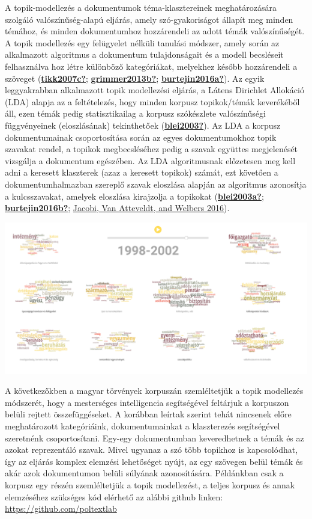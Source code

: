 \documentclass[
]{book}
\begin{document}
A topik-modellezés a dokumentumok téma-klasztereinek meghatározására
szolgáló valószínűség-alapú eljárás, amely szó-gyakoriságot állapít meg
minden témához, és minden dokumentumhoz hozzárendeli az adott témák
valószínűségét. A topik modellezés egy felügyelet nélküli tanulási
módszer, amely során az alkalmazott algoritmus a dokumentum
tulajdonságait és a modell becsléseit felhasználva hoz létre különböző
kategóriákat, melyekhez később hozzárendeli a szöveget
(\protect\hyperlink{ref-tikk2007c}{\textbf{tikk2007c?}};
\protect\hyperlink{ref-grimmer2013b}{\textbf{grimmer2013b?}};
\protect\hyperlink{ref-burtejin2016a}{\textbf{burtejin2016a?}}). Az
egyik leggyakrabban alkalmazott topik modellezési eljárás, a Látens
Dirichlet Allokáció (LDA) alapja az a feltételezés, hogy minden korpusz
topikok/témák keverékéből áll, ezen témák pedig statisztikailag a
korpusz szókészlete valószínűségi függvényeinek (eloszlásának)
tekinthetőek (\protect\hyperlink{ref-blei2003}{\textbf{blei2003?}}). Az
LDA a korpusz dokumentumainak csoportosítása során az egyes
dokumentumokhoz topik szavakat rendel, a topikok megbecsléséhez pedig a
szavak együttes megjelenését vizsgálja a dokumentum egészében. Az LDA
algoritmusnak előzetesen meg kell adni a keresett klaszterek (azaz a
keresett topikok) számát, ezt követően a dokumentumhalmazban szereplő
szavak eloszlása alapján az algoritmus azonosítja a kulcsszavakat,
amelyek eloszlása kirajzolja a topikokat
(\protect\hyperlink{ref-blei2003a}{\textbf{blei2003a?}};
\protect\hyperlink{ref-burtejin2016b}{\textbf{burtejin2016b?}};
\protect\hyperlink{ref-jacobi2016}{Jacobi, Van Atteveldt, and Welbers
2016}).

\begin{center}\includegraphics[width=0.9\linewidth]{figures/08-01_topik_modell} \end{center}

A következőkben a magyar törvények korpuszán szemléltetjük a topik
modellezés módszerét, hogy a mesterséges intelligencia segítségével
feltárjuk a korpuszon belüli rejtett összefüggéseket. A korábban leírtak
szerint tehát nincsenek előre meghatározott kategóriáink,
dokumentumainkat a klaszterezés segítségével szeretnénk csoportosítani.
Egy-egy dokumentumban keveredhetnek a témák és az azokat reprezentáló
szavak. Mivel ugyanaz a szó több topikhoz is kapcsolódhat, így az
eljárás komplex elemzési lehetőséget nyújt, az egy szövegen belül témák
és akár azok dokumentumon belüli súlyának azonosítására. Példánkban csak
a korpusz egy részén szemléltetjük a topik modellezést, a teljes korpusz
és annak elemzéséhez szükséges kód elérhető az alábbi github linken:
\url{https://github.com/poltextlab}
\end{document}
